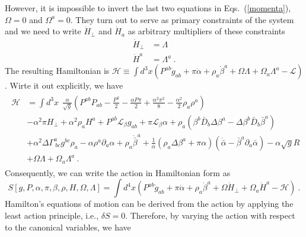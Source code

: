 However, it is impossible to invert the last two equations in Eqs.~(\ref{momenta}), $\Omega = 0$ and $\Omega^{a} = 0$. They turn out to serve as primary constraints of the system and we need to write ${\dot H}_{\perp}$ and ${\dot H}_{a}$ as arbitrary multipliers of these constraints
\begin{subequations}
\begin{align}
{\dot H}_{\perp} & = \Lambda\\
{\dot H}^{a} & = \Lambda^{a} \ .
\end{align}
\end{subequations}
The resulting Hamiltonian is $\mathscr{H} \equiv \int d^{3}x \left( P^{ab}{\dot g}_{ab} + \pi {\dot \alpha} + \rho_{a}{\dot \beta}^{a} + \Omega \Lambda + \Omega_{a}\Lambda^{a} - \mathscr{L} \right)$. Wirte it out explicitly, we have
\begin{align}
\begin{split}
\mathscr{H} &= \int d^{3}x~~ \frac{\alpha}{\sqrt{g}}\left(P^{ab}P_{ab} - \frac{P^{2}}{2} - \frac{\alpha P \pi}{2} + \frac{\alpha^{2}\pi^{2}}{8} - \frac{\alpha^{2}}{2}\rho_{a}\rho^{a}\right)\\
& -\alpha^{2}\pi H_{\perp} + \alpha^{2}\rho_{a}H^{a} + P^{ab} \mathcal{L}_{\beta}g_{ab} + \pi \mathcal{L}_{\beta}\alpha + \rho_{a}\left(\beta^{b}{\bar D}_{b}\Delta \beta^{a} - \Delta \beta^{b} {\bar D}_{b}{\bar \beta}^{a}\right)\\
& + \alpha^{2}\Delta\Gamma^{a}_{~bc}g^{bc}\rho_{a} - \alpha \rho^{a}\partial_{a}\alpha + \rho_{a}{\dot {\bar \beta}}^{a} + \frac{1}{{\bar \alpha}}\left(\rho_{a}\Delta \beta^{a} + \pi \alpha \right)\left({\dot {\bar \alpha}} - {\bar \beta}^{a}\partial_{a}{\bar \alpha}\right) - \alpha\sqrt{g}R\\
& + \Omega \Lambda + \Omega_{a}\Lambda^{a} \ .
\end{split}
\end{align}
Consequently, we can write the action in Hamiltonian form as
\begin{equation}\label{non covariant action}
S[g, P, \alpha, \pi, \beta, \rho, H, \Omega, \Lambda ] = \int d^{4}x \left(P^{ab}{\dot g}_{ab} + \pi {\dot \alpha} + \rho_{a}{\dot \beta}^{a} + \Omega{\dot H_{\perp}} + \Omega_{a}{\dot H}^{a} - \mathscr{H}\right) \ .
\end{equation}
Hamilton's equations of motion can be derived from the action by applying the least action principle, i.e., $\delta S = 0$. Therefore, by varying the action with respect to the canonical variables, we have

